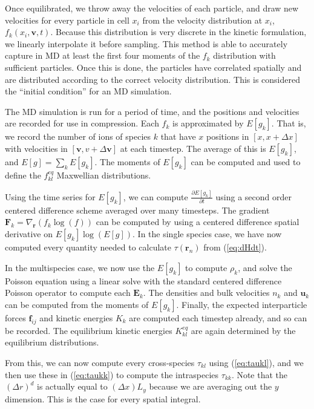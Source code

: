 \documentclass{article}
\begin{document}
Once equilibrated, we throw away the velocities of each particle, and draw new velocities for every particle in cell $x_i$ from the velocity distribution at $x_i$, $f_k(x_i,\mathbf{v},t)$. Because this distribution is very discrete in the kinetic formulation, we linearly interpolate it before sampling. This method is able to accurately capture in MD at least the first four moments of the $f_k$ distribution with sufficient particles. Once this is done, the particles have correlated spatially and are distributed according to the correct velocity distribution. This is considered the ``initial condition'' for an MD simulation.

The MD simulation is run for a period of time, and the positions and velocities are recorded for use in compression. Each $f_k$ is approximated by $E[g_k]$. That is, we record the number of ions of species $k$ that have $x$ positions in $[x,x+\Delta x]$ with velocities in $[\mathbf{v},v+\Delta \mathbf{v}]$ at each timestep. The average of this is $E[g_k]$, and $E[g]=\sum_k E[g_k]$. The moments of $E[g_k]$ can be computed and used to define the $f_{kl}^{eq}$ Maxwellian distributions.

Using the time series for $E[g_k]$, we can compute $\frac{\partial E[g_k]}{\partial t}$ using a second order centered difference scheme averaged over many timesteps. The gradient $\mathbf{F}_k=\nabla_\mathbf{r}(f_k\log(f))$ can be computed by using a centered difference spatial derivative on $E[g_k]\log(E[g])$. In the single species case, we have now computed every quantity needed to calculate $\tau(\mathbf{r}_n)$ from (\ref{eq:dHdt}).

In the multispecies case, we now use the $E[g_k]$ to compute $\rho_k$, and solve the Poisson equation using a linear solve with the standard centered difference Poisson operator to compute each $\mathbf{E}_k$. The densities and bulk velocities $n_k$ and $\mathbf{u}_k$ can be computed from the moments of $E[g_k]$. Finally, the expected interparticle forces $\mathbf{f}_{ij}$ and kinetic energies $K_k$ are computed each timestep already, and so can be recorded. The equilibrium kinetic energies $K_{kl}^{eq}$ are again determined by the equilibrium distributions.

From this, we can now compute every cross-species $\tau_{kl}$ using (\ref{eq:taukl}), and we then use these in (\ref{eq:taukk}) to compute the intraspecies $\tau_{kk}$. Note that the $(\Delta r)^d$ is actually equal to $(\Delta x)L_y$ because we are averaging out the $y$ dimension. This is the case for every spatial integral.
\end{document}
